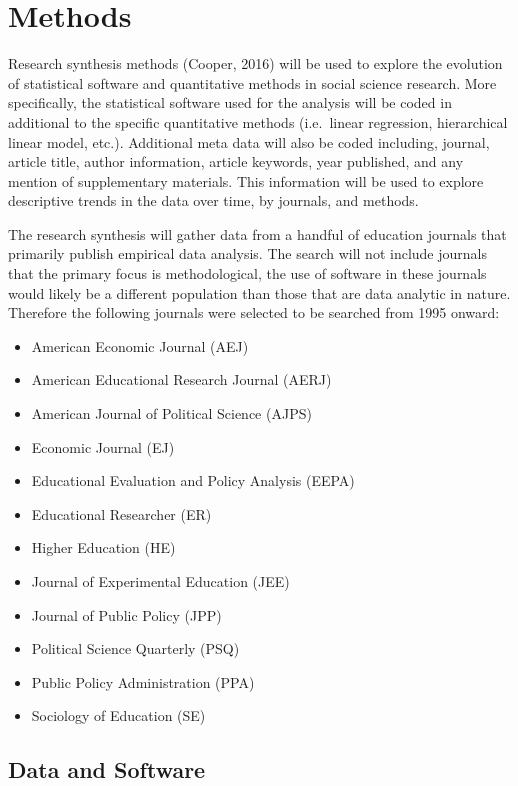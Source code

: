 \documentclass[english,,man]{apa6}
\providecommand{\tightlist}{%
  \setlength{\itemsep}{0pt}\setlength{\parskip}{0pt}}
\theoremstyle{definition}
\theoremstyle{definition}
\theoremstyle{definition}
\theoremstyle{remark}
\begin{document}
\hypertarget{methods}{%
\section{Methods}\label{methods}}

Research synthesis methods (Cooper, 2016) will be used to explore the
evolution of statistical software and quantitative methods in social
science research. More specifically, the statistical software used for
the analysis will be coded in additional to the specific quantitative
methods (i.e.~linear regression, hierarchical linear model, etc.).
Additional meta data will also be coded including, journal, article
title, author information, article keywords, year published, and any
mention of supplementary materials. This information will be used to
explore descriptive trends in the data over time, by journals, and
methods.

The research synthesis will gather data from a handful of education
journals that primarily publish empirical data analysis. The search will
not include journals that the primary focus is methodological, the use
of software in these journals would likely be a different population
than those that are data analytic in nature. Therefore the following
journals were selected to be searched from 1995 onward:

\begin{itemize}
\tightlist
\item
  American Economic Journal (AEJ)
\item
  American Educational Research Journal (AERJ)
\item
  American Journal of Political Science (AJPS)
\item
  Economic Journal (EJ)
\item
  Educational Evaluation and Policy Analysis (EEPA)
\item
  Educational Researcher (ER)
\item
  Higher Education (HE)
\item
  Journal of Experimental Education (JEE)
\item
  Journal of Public Policy (JPP)
\item
  Political Science Quarterly (PSQ)
\item
  Public Policy Administration (PPA)
\item
  Sociology of Education (SE)
\end{itemize}

\hypertarget{data-and-software}{%
\subsection{Data and Software}\label{data-and-software}}
\end{document}
